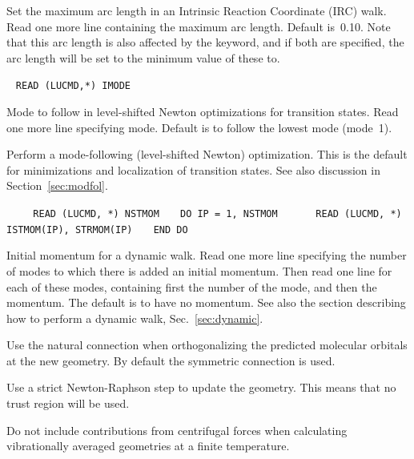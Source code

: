 \begin{description}
Set the maximum arc length in an Intrinsic Reaction Coordinate (IRC)
walk. Read one more
line containing the maximum arc length.
Default is~0.10. Note that this arc length is also affected by the
 keyword, and if both are specified, the arc length will
be set to the minimum value of these to.

\item[\Key{MODE}]\verb| |\newline
\verb|READ (LUCMD,*) IMODE|

Mode to follow in level-shifted Newton optimizations for transition
states.  Read one more line specifying
mode. Default is to follow
the lowest mode (mode~1).

\item[\Key{MODFOL}] Perform a mode-following (level-shifted
Newton) optimization. This is the default for minimizations and
localization of transition states. See also discussion in
Section~\ref{sec:modfol}.

\item[\Key{MOMENT}]\verb| |\newline
\verb|   READ (LUCMD, *) NSTMOM|\newline
\verb|   DO IP = 1, NSTMOM|\newline
\verb|      READ (LUCMD, *) ISTMOM(IP), STRMOM(IP)|\newline
\verb|   END DO|

Initial momentum for a dynamic walk.
Read one more line specifying
the number of modes to which there is added an initial momentum. Then
read one line for each of these modes, containing first the number of
the mode, and then the momentum. The default is to have no momentum.
See also the section describing how to perform a dynamic
walk, Sec.~\ref{sec:dynamic}.

\item[\Key{NATCON}] Use the natural connection when orthogonalizing
the predicted molecular orbitals at the new geometry. By default the
symmetric connection is used.

\item[\Key{NEWTON}] Use a strict Newton-Raphson step to update
the geometry. This means that no trust region will be used.

\item[\Key{NO CENTRIFUGAL FORCES}] Do not include contributions from
centrifugal forces when calculating vibrationally averaged geometries
at a finite temperature.


\end{description}

